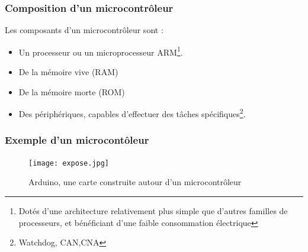 \documentclass{beamer}
\begin{document}
\begin{frame}
\frametitle{Composition d'un microcontrôleur}
  Les composants d'un microcontrôleur sont :
  \begin{itemize}
      \item Un processeur ou un microprocesseur ARM\footnote{Dotés d'une architecture relativement plus simple que d'autres familles de processeurs, et bénéficiant d'une faible consommation électrique }.
      \item De la mémoire vive (RAM) 
      \item De la mémoire morte (ROM) 	
      \item Des périphériques, capables d'effectuer des tâches spécifiques\footnote{Watchdog, CAN,CNA}.
  \end{itemize}
\end{frame}


\begin{frame}
\frametitle{Exemple d'un microcontôleur}
\begin{figure}[!h]
\centering
\texttt{[image: expose.jpg]}
\caption{Arduino, une carte construite autour d'un  microcontrôleur}
\end{figure}
\end{frame}
\end{document}
